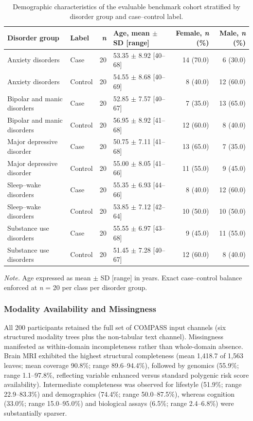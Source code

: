 \documentclass[11pt,a4paper,twoside]{article}
\begin{document}
\begin{table}[H]
\caption{Demographic characteristics of the evaluable benchmark cohort stratified by disorder group and case--control label.}
\label{tab:t1}
\small
\begin{tabularx}{\linewidth}{X l r X r r}
\toprule
Disorder group & Label & \textit{n} & Age, mean $\pm$ SD [range] & Female, \textit{n} (\%) & Male, \textit{n} (\%) \\
\midrule
Anxiety disorders & Case & 20 & 53.35 $\pm$ 8.92 [40--68] & 14 (70.0) & 6 (30.0) \\
Anxiety disorders & Control & 20 & 54.55 $\pm$ 8.68 [40--69] & 8 (40.0) & 12 (60.0) \\
Bipolar and manic disorders & Case & 20 & 52.85 $\pm$ 7.57 [40--67] & 7 (35.0) & 13 (65.0) \\
Bipolar and manic disorders & Control & 20 & 56.95 $\pm$ 8.92 [41--68] & 12 (60.0) & 8 (40.0) \\
Major depressive disorder & Case & 20 & 50.75 $\pm$ 7.11 [41--68] & 13 (65.0) & 7 (35.0) \\
Major depressive disorder & Control & 20 & 55.00 $\pm$ 8.05 [41--66] & 11 (55.0) & 9 (45.0) \\
Sleep--wake disorders & Case & 20 & 55.35 $\pm$ 6.93 [44--66] & 8 (40.0) & 12 (60.0) \\
Sleep--wake disorders & Control & 20 & 53.85 $\pm$ 7.12 [42--64] & 10 (50.0) & 10 (50.0) \\
Substance use disorders & Case & 20 & 55.55 $\pm$ 6.97 [43--68] & 9 (45.0) & 11 (55.0) \\
Substance use disorders & Control & 20 & 51.45 $\pm$ 7.28 [40--67] & 12 (60.0) & 8 (40.0) \\
\bottomrule
\end{tabularx}
\par\smallskip\noindent\small\textit{Note.} Age expressed as mean $\pm$ SD [range] in years. Exact case--control balance enforced at \textit{n} = 20 per class per disorder group.
\end{table}

\subsubsection{Modality Availability and Missingness}

All 200 participants retained the full set of COMPASS input channels (six structured modality trees plus the non-tabular text channel). Missingness manifested as within-domain incompleteness rather than whole-domain absence. Brain MRI exhibited the highest structural completeness (mean 1,418.7 of 1,563 leaves; mean coverage 90.8\%; range 89.6--94.4\%), followed by genomics (55.9\%; range 1.1--97.8\%, reflecting variable enhanced versus standard polygenic risk score availability). Intermediate completeness was observed for lifestyle (51.9\%; range 22.9--83.3\%) and demographics (74.4\%; range 50.0--87.5\%), whereas cognition (33.0\%; range 15.0--95.0\%) and biological assays (6.5\%; range 2.4--6.8\%) were substantially sparser.
\end{document}
